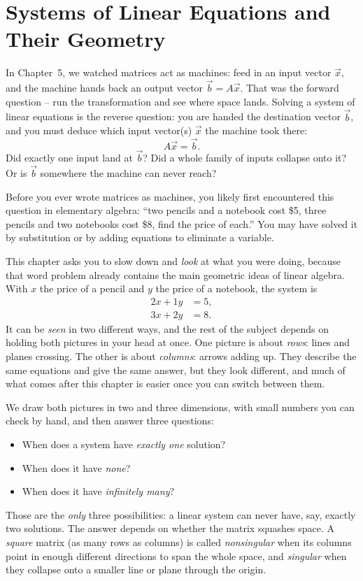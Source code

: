 \chapter{Systems of Linear Equations and Their Geometry}

In Chapter~5, we watched matrices act as machines: feed in an input vector
$\vec{x}$, and the machine hands back an output vector $\vec{b} = A\vec{x}$.
That was the forward question -- run the transformation and see where space
lands. Solving a system of linear equations is the reverse question: you are
handed the destination vector $\vec{b}$, and you must deduce which input
vector(s) $\vec{x}$ the machine took there:
\[
  A\vec{x} = \vec{b}.
\]
Did exactly one input land at $\vec{b}$? Did a whole family of inputs
collapse onto it? Or is $\vec{b}$ somewhere the machine can never reach?

Before you ever wrote matrices as machines, you likely first encountered this question
in elementary algebra: ``two pencils and a notebook cost \$5, three pencils and two
notebooks cost \$8, find the price of each.'' You may have solved it by substitution
or by adding equations to eliminate a variable.

This chapter asks you to slow down and \emph{look} at what you were doing,
because that word problem already contains the main geometric ideas of
linear algebra. With $x$ the price of a pencil and $y$ the price of a
notebook, the system is
\[
  \begin{aligned}
    2x + 1y &= 5,\\
    3x + 2y &= 8.
  \end{aligned}
\]
It can be \emph{seen} in two different ways, and the rest of the subject
depends on holding both pictures in your head at once. One picture is about
\emph{rows}: lines and planes crossing. The other is about \emph{columns}:
arrows adding up. They describe the same equations and give the same answer,
but they look different, and much of what comes after this chapter is
easier once you can switch between them.

We draw both pictures in two and three dimensions, with small numbers you
can check by hand, and then answer three questions:
\begin{itemize}
  \item When does a system have \emph{exactly one} solution?
  \item When does it have \emph{none}?
  \item When does it have \emph{infinitely many}?
\end{itemize}
Those are the \emph{only} three possibilities: a linear system can never
have, say, exactly two solutions. The answer depends on whether the matrix
squashes space. A \emph{square} matrix (as many rows as columns) is called
\emph{nonsingular} when its columns point in enough different directions to
span the whole space, and \emph{singular} when they collapse onto a smaller
line or plane through the origin.

